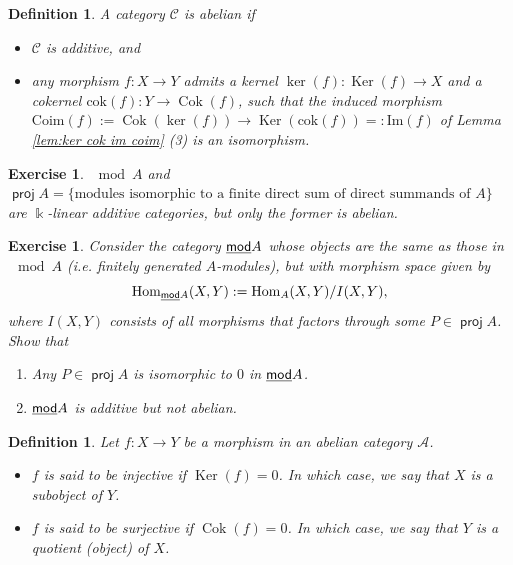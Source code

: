 \documentclass[11pt,a4paper]{article}
\numberwithin{equation}{section}
\theoremstyle{all}
\newtheorem{definition}[theorem]{Definition}
\newtheorem{exercise}[theorem]{Exercise}
\theoremstyle{remark}
\newcommand{\CC}{\mathcal{C}}
\newcommand{\Hom}{\operatorname{Hom}\nolimits}
\newcommand{\Ker}{\operatorname{Ker}\nolimits}
\newcommand{\Cok}{\operatorname{Cok}\nolimits}
\DeclareMathOperator{\proj}{\mathsf{proj}}
\newcommand{\defn}[1]{\textsl{\color{darkblue} #1}}
\begin{document}
\begin{definition}
A category $\CC$ is \defn{abelian} if
\begin{itemize}
\item $\CC$ is additive, and
\item any morphism $f:X\to Y$ admits a kernel $\ker(f):\Ker(f)\to X$ and a cokernel $\mathrm{cok}(f):Y\to \Cok(f)$, such that the induced morphism $\mathrm{Coim}(f):=\Cok(\ker(f))\to \Ker(\mathrm{cok}(f))=:\mathrm{Im}(f)$ of Lemma \ref{lem:ker cok im coim} (3) is an isomorphism.
\end{itemize}
\end{definition}


\begin{exercise}
$\mod A$ and $\proj A = \{\text{modules isomorphic to a finite direct sum of direct summands of $A$}\}$ are $\Bbbk$-linear additive categories, but only the former is abelian.
\end{exercise}

\begin{exercise}
Consider the category $\underline{\mod} A$ whose objects are the same as those in $\mod A$ (i.e. finitely generated $A$-modules), but with morphism space given by
\[\Hom_{\underline{\mod}A}(X,Y):=\Hom_A(X,Y)/I(X,Y),\]
where $I(X,Y)$ consists of all morphisms that factors through some $P\in \proj A$.
Show that
\begin{enumerate}
\item Any $P\in \proj A$ is isomorphic to $0$ in $\underline{\mod}A$.
\item $\underline{\mod}A$ is additive but not abelian.
\end{enumerate}
\end{exercise}

\begin{definition}
Let $f:X\to Y$ be a morphism in an abelian category $\mathcal{A}$.
\begin{itemize}
\item $f$ is said to be \defn{injective} if $\Ker(f)=0$.  In which case, we say that $X$ is a \defn{subobject} of $Y$.

\item $f$ is said to be \defn{surjective} if $\Cok(f)=0$.  In which case, we say that $Y$ is a \defn{quotient} (object) of $X$.
\end{itemize}
\end{definition}
\end{document}
